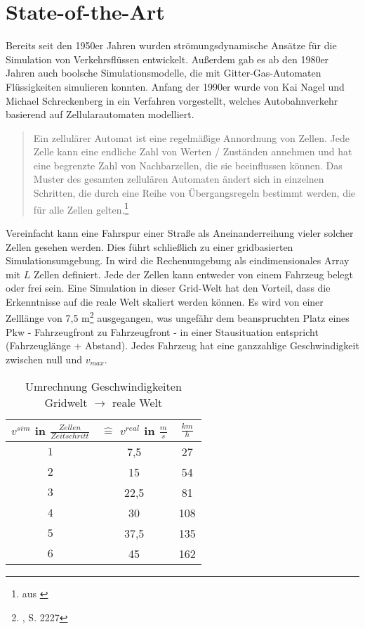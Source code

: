 \section{State-of-the-Art}
\label{sec:sota}

Bereits seit den 1950er Jahren wurden strömungsdynamische Ansätze für die Simulation von Verkehrsflüssen entwickelt. 
Außerdem gab es ab den 1980er Jahren auch boolsche Simulationsmodelle, die mit Gitter-Gas-Automaten Flüssigkeiten simulieren konnten.
Anfang der 1990er wurde von Kai Nagel und Michael Schreckenberg in \cite{na-sch} ein Verfahren vorgestellt, welches Autobahnverkehr basierend auf Zellularautomaten modelliert. 

\begin{quote}
Ein zellulärer Automat ist eine regelmäßige Annordnung von Zellen. Jede Zelle kann eine endliche Zahl von Werten / Zuständen annehmen und hat eine  begrenzte Zahl von Nachbarzellen, die sie beeinflussen können. Das Muster des gesamten zellulären Automaten ändert sich in einzelnen Schritten, die durch eine Reihe von Übergangsregeln bestimmt werden, die für alle Zellen gelten.\footnote{aus \cite{cell-autom}}
\end{quote}

Vereinfacht kann eine Fahrspur einer Straße als Aneinanderreihung vieler solcher Zellen gesehen werden. 
Dies führt schließlich zu einer gridbasierten Simulationsumgebung. 
In \cite{na-sch} wird die Rechenumgebung als eindimensionales Array mit $L$ Zellen definiert. 
Jede der Zellen kann entweder von einem Fahrzeug belegt oder frei sein. 
Eine Simulation in dieser Grid-Welt hat den Vorteil, dass die Erkenntnisse auf die reale Welt skaliert werden können. 
Es wird von einer Zelllänge von 7,5 m\footnote{\cite{na-sch}, S. 2227} ausgegangen, was ungefähr dem beanspruchten Platz eines Pkw - Fahrzeugfront zu Fahrzeugfront - in einer Stausituation entspricht (Fahrzeuglänge + Abstand). 
Jedes Fahrzeug hat eine ganzzahlige Geschwindigkeit zwischen null und $v_{max}$.

\begin{table}[ht]
\begin{center}
\setlength{\tabcolsep}{0.5em} %
{\renewcommand{\arraystretch}{1.2}%
\begin{tabular}{| c | c | c |}
\hline 
$v^{sim}$ in $\frac{Zellen}{Zeitschritt}$ & $\widehat{=}$ $v^{real}$ in $\frac{m}{s}$ & $\frac{km}{h}$ \\ \hline 
$1$ & 7,5 & 27 \\ \hline
$2$ & 15 & 54 \\ \hline
$3$ & 22,5 & 81 \\ \hline
$4$ & 30 & 108 \\ \hline
$5$ & 37,5 & 135 \\ \hline
$6$ & 45 & 162 \\ \hline
\end{tabular}
}
\caption{Umrechnung Geschwindigkeiten Gridwelt $\rightarrow$ reale Welt}
\end{center}
\label{tab:umrechnung-zelle-kmh}
\end{table}

